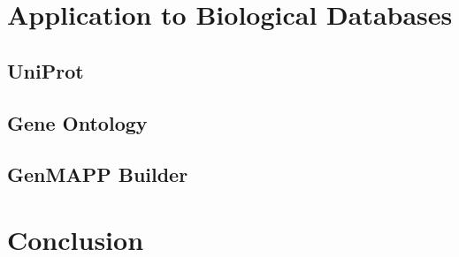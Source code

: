 \documentclass[11pt]{article}
\begin{document}
\section{Application to Biological Databases}

\subsection{UniProt}

\subsection{Gene Ontology}

\subsection{GenMAPP Builder}

\section{Conclusion}



\end{document}
